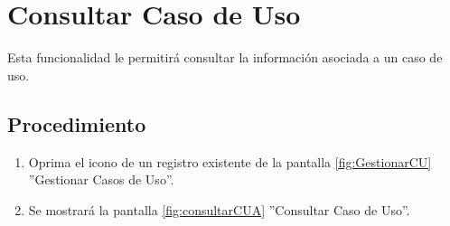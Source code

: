 \hypertarget{cv:consultarCU}{\section{Consultar Caso de Uso}} \label{sec:consultarCU}

	Esta funcionalidad le permitirá consultar la información asociada a un caso de uso.

		\subsection{Procedimiento}

			\begin{enumerate}
	
			\item Oprima el icono \IUConsultar{} de un registro existente de la pantalla \ref{fig:GestionarCU} ''Gestionar Casos de Uso''.
	
			\item Se mostrará la pantalla \ref{fig:consultarCUA} ''Consultar Caso de Uso''.
			

\end{enumerate}
